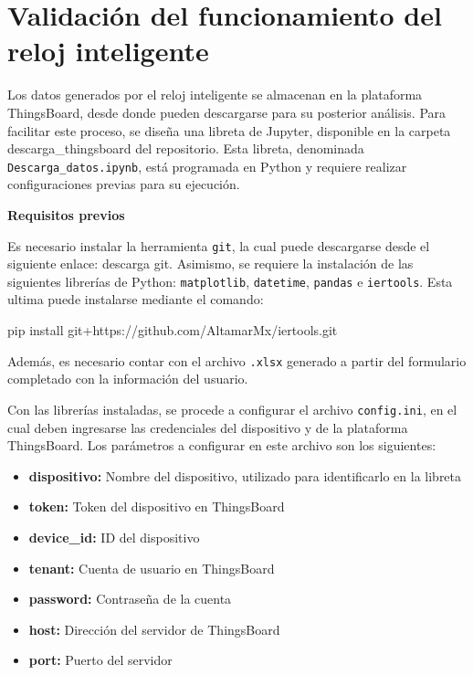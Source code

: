 \documentclass[
  12pt,
  letterpaper,
  DIV=11,
  numbers=noendperiod]{scrreport}
\newenvironment{Shaded}{\begin{snugshade}}{\end{snugshade}}
\newcommand{\ExtensionTok}[1]{\textcolor[rgb]{0.00,0.23,0.31}{#1}}
\newcommand{\NormalTok}[1]{\textcolor[rgb]{0.00,0.23,0.31}{#1}}
\providecommand{\tightlist}{%
  \setlength{\itemsep}{0pt}\setlength{\parskip}{0pt}}\usepackage{longtable,booktabs,array}
\begin{document}
\hypertarget{sec-validaciuxf3n}{%
\section{Validación del funcionamiento del reloj
inteligente}\label{sec-validaciuxf3n}}

Los datos generados por el reloj inteligente se almacenan en la
plataforma ThingsBoard, desde donde pueden descargarse para su posterior
análisis. Para facilitar este proceso, se diseña una libreta de Jupyter,
disponible en la carpeta descarga\_thingsboard del repositorio. Esta
libreta, denominada \texttt{Descarga\_datos.ipynb}, está programada en
Python y requiere realizar configuraciones previas para su ejecución.

\textbf{Requisitos previos}

Es necesario instalar la herramienta \texttt{git}, la cual puede
descargarse desde el siguiente enlace: descarga git. Asimismo, se
requiere la instalación de las siguientes librerías de Python:
\texttt{matplotlib}, \texttt{datetime}, \texttt{pandas} e
\texttt{iertools}. Esta ultima puede instalarse mediante el comando:

\begin{Shaded}
\begin{Highlighting}[]
\ExtensionTok{pip}\NormalTok{ install git+https://github.com/AltamarMx/iertools.git}
\end{Highlighting}
\end{Shaded}

Además, es necesario contar con el archivo \texttt{.xlsx} generado a
partir del formulario completado con la información del usuario.

Con las librerías instaladas, se procede a configurar el archivo
\texttt{config.ini}, en el cual deben ingresarse las credenciales del
dispositivo y de la plataforma ThingsBoard. Los parámetros a configurar
en este archivo son los siguientes:

\begin{itemize}
\tightlist
\item
  \textbf{dispositivo:} Nombre del dispositivo, utilizado para
  identificarlo en la libreta
\item
  \textbf{token:} Token del dispositivo en ThingsBoard
\item
  \textbf{device\_id:} ID del dispositivo
\item
  \textbf{tenant:} Cuenta de usuario en ThingsBoard
\item
  \textbf{password:} Contraseña de la cuenta
\item
  \textbf{host:} Dirección del servidor de ThingsBoard
\item
  \textbf{port:} Puerto del servidor
\end{itemize}
\end{document}
